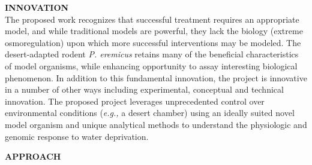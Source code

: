 \documentclass[11pt]{article}
\begin{document}

\noindent \textbf{INNOVATION} \\


\noindent The proposed work recognizes that successful treatment requires an appropriate model, and while traditional models are powerful, they lack the biology (extreme osmoregulation) upon which more successful interventions may be modeled. The desert-adapted rodent \textit{P. eremicus} retains many of the beneficial characteristics of model organisms, while enhancing opportunity to assay interesting biological phenomenon. In addition to this fundamental innovation, the project is innovative in a number of other ways including experimental, conceptual and technical innovation. The proposed project leverages unprecedented control over environmental conditions (\textit{e.g.,} a desert chamber) using an ideally suited novel model organism and unique analytical methods to understand the physiologic and genomic response to water deprivation.
 

\newpage

\linespread{1.2}


\noindent \textbf{APPROACH}

\end{document}
